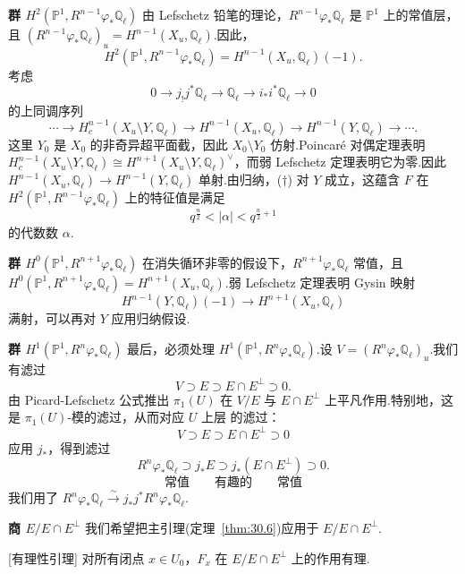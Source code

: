 \textbf{群 $H^{2}(\mathbb{P}^{1}, R^{n-1}\varphi_{*}\mathbb{Q}_{\ell})$} 由 Lefschetz 铅笔的理论，$R^{n-1}\varphi_{*}\mathbb{Q}_{\ell}$ 是 $\mathbb{P}^{1}$ 上的常值层，且 $(R^{n-1}\varphi_{*}\mathbb{Q}_{\ell})_u = H^{n-1}(X_u, \mathbb{Q}_{\ell})$.因此，
\[
H^{2}(\mathbb{P}^{1}, R^{n-1}\varphi_{*}\mathbb{Q}_{\ell}) = H^{n-1}(X_u, \mathbb{Q}_{\ell})(-1).
\]
考虑
\[
0 \to j_{!}j^{*}\mathbb{Q}_{\ell} \to \mathbb{Q}_{\ell} \to i_{*}i^{*}\mathbb{Q}_{\ell} \to 0
\]
的上同调序列
\[
\cdots \to H^{n-1}_{c}(X_u \setminus Y, \mathbb{Q}_{\ell}) \to H^{n-1}(X_u, \mathbb{Q}_{\ell}) \to H^{n-1}(Y, \mathbb{Q}_{\ell}) \to \cdots.
\]
这里 $Y_0$ 是 $X_0$ 的非奇异超平面截，因此 $X_0 \setminus Y_0$ 仿射.Poincar\'e 对偶定理表明 $H^{n-1}_{c}(X_u \setminus Y, \mathbb{Q}_{\ell}) \cong H^{n+1}(X_u \setminus Y, \mathbb{Q}_{\ell})^{\vee}$，而弱 Lefschetz 定理表明它为零.因此 $H^{n-1}(X_u, \mathbb{Q}_{\ell}) \to H^{n-1}(Y, \mathbb{Q}_{\ell})$ 单射.由归纳，($\dagger$) 对 $Y$ 成立，这蕴含 $F$ 在 $H^{2}(\mathbb{P}^{1}, R^{n-1}\varphi_{*}\mathbb{Q}_{\ell})$ 上的特征值是满足
\[
q^{\frac{n}{2}} < |\alpha| < q^{\frac{n}{2}+1}
\]
的代数数 $\alpha$.

\textbf{群 $H^{0}(\mathbb{P}^{1}, R^{n+1}\varphi_{*}\mathbb{Q}_{\ell})$} 在消失循环非零的假设下，$R^{n+1}\varphi_{*}\mathbb{Q}_{\ell}$ 常值，且 $H^{0}(\mathbb{P}^{1}, R^{n+1}\varphi_{*}\mathbb{Q}_{\ell}) = H^{n+1}(X_u, \mathbb{Q}_{\ell})$.弱 Lefschetz 定理表明 Gysin 映射
\[
H^{n-1}(Y, \mathbb{Q}_{\ell})(-1) \to H^{n+1}(X_u, \mathbb{Q}_{\ell})
\]
满射，可以再对 $Y$ 应用归纳假设.

\textbf{群 $H^{1}(\mathbb{P}^{1}, R^{n}\varphi_{*}\mathbb{Q}_{\ell})$} 最后，必须处理 $H^{1}(\mathbb{P}^{1}, R^{n}\varphi_{*}\mathbb{Q}_{\ell})$.设 $V = (R^{n}\varphi_{*}\mathbb{Q}_{\ell})_u$.我们有滤过
\[
V \supset E \supset E \cap E^{\perp} \supset 0.
\]
由 Picard-Lefschetz 公式推出 $\pi_1(U)$ 在 $V/E$ 与 $E \cap E^{\perp}$ 上平凡作用.特别地，这是 $\pi_1(U)$-模的滤过，从而对应 $U$ 上层 的滤过：
\[
V \supset E \supset E \cap E^{\perp} \supset 0
\]
应用 $j_{*}$，得到滤过
\[
R^{n}\varphi_{*}\mathbb{Q}_{\ell} \supset j_{*}E \supset j_{*}(E \cap E^{\perp}) \supset 0.
\]
\[
\text{常值} \qquad \text{有趣的} \qquad \text{常值}
\]
我们用了 $R^{n}\varphi_{*}\mathbb{Q}_{\ell} \xrightarrow{\sim} j_{*}j^{*}R^{n}\varphi_{*}\mathbb{Q}_{\ell}$.

\textbf{商 $E/E \cap E^{\perp}$} 我们希望把主引理(定理~\ref{thm:30.6})应用于 $E/E \cap E^{\perp}$.

\begin{lemma}\label{lem:33.3}[有理性引理]
对所有闭点 $x \in U_0$，$F_x$ 在 $E/E \cap E^{\perp}$ 上的作用有理.
\end{lemma}

